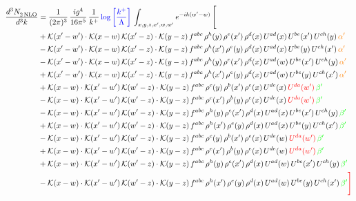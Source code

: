 \documentclass[9pt]{article}
\newcommand{\chg}[1]{{\color{red}#1}}
\numberwithin{equation}{section}
\begin{document}
\begin{align}
  \frac{d^{3}N_{2\,\rm NLO}^{\rm}}{d^{3}k}  & = \frac{1}{(2\pi)^{3}}\, \frac{ig^{4}}{16\pi^{5}}\, \frac{1}{k^{+}}\, {\color{blue}\log{\left[\frac{k^{+}}{\Lambda}\right]}}\, \int_{x,y,z,x^{\prime},w,w^{\prime}}e^{-ik(w^{\prime}-w)}\, \Bigg[\notag \\ &   +\mathcal{K}(x'-w')\cdot\mathcal{K}(x-w)\,\mathcal{K}(x'-z)\cdot\mathcal{K}(y-z)\, f^{abc}\,\rho^{h}(y)\,\rho^{e}(x')\,\rho^{d}(x)\,U^{ad}(x)\,U^{be}(x')\,U^{ch}(y)\,{\color{orange}\alpha'}\notag\\ &-\mathcal{K}(x'-w')\cdot\mathcal{K}(x-w)\,\mathcal{K}(x'-z)\cdot\mathcal{K}(y-z)\, f^{abc}\,\rho^{h}(x')\,\rho^{e}(y)\,\rho^{d}(x)\,U^{ad}(x)\,U^{be}(y)\,U^{ch}(x')\,{\color{orange}\alpha'}\notag\\ &-\mathcal{K}(x'-w')\cdot\mathcal{K}(x-w)\,\mathcal{K}(x'-z)\cdot\mathcal{K}(y-z)\, f^{abc}\,\rho^{h}(y)\,\rho^{e}(x')\,\rho^{d}(x)\,U^{ad}(w)\,U^{be}(x')\,U^{ch}(y)\,{\color{orange}\alpha'}\notag \\ &+\mathcal{K}(x'-w')\cdot\mathcal{K}(x-w)\,\mathcal{K}(x'-z)\cdot\mathcal{K}(y-z)\, f^{abc}\,\rho^{h}(x')\,\rho^{e}(y)\,\rho^{d}(x)\,U^{ad}(w)\,U^{be}(y)\,U^{ch}(x')\,{\color{orange}\alpha'}\notag \\ & +\mathcal{K}(x-w)\cdot\mathcal{K}(x'-w')\,\mathcal{K}(w'-z)\cdot\mathcal{K}(y-z)\, f^{abc}\,\rho^{c}(y)\,\rho^{b}(x')\,\rho^{e}(x)\,U^{de}(x)\,{\color{red}U^{da}(w')}\,{\color{green}\beta'}\notag \\ &-\mathcal{K}(x-w)\cdot\mathcal{K}(x'-w')\,\mathcal{K}(w'-z)\cdot\mathcal{K}(y-z)\, f^{abc}\,\rho^{c}(x')\,\rho^{b}(y)\,\rho^{e}(x)\,U^{de}(x)\,{\color{red}U^{da}(w')}\,{\color{green}\beta'}\notag \\ & -\mathcal{K}(x-w)\cdot\mathcal{K}(x'-w')\,\mathcal{K}(w'-z)\cdot\mathcal{K}(y-z)\, f^{abc}\,\rho^{h}(y)\,\rho^{e}(x')\,\rho^{d}(x)\,U^{ad}(x)\,U^{be}(x')\,U^{ch}(y)\,{\color{green}\beta'}\notag\\ &+\mathcal{K}(x-w)\cdot\mathcal{K}(x'-w')\,\mathcal{K}(w'-z)\cdot\mathcal{K}(y-z)\, f^{abc}\,\rho^{h}(x')\,\rho^{e}(y)\,\rho^{d}(x)\,U^{ad}(x)\,U^{be}(y)\,U^{ch}(x')\,{\color{green}\beta'}\notag\\ &-\mathcal{K}(x-w)\cdot\mathcal{K}(x'-w')\,\mathcal{K}(w'-z)\cdot\mathcal{K}(y-z)\, f^{abc}\,\rho^{c}(y)\,\rho^{b}(x')\,\rho^{e}(x)\,U^{de}(w)\,{\color{red}U^{da}(w')}\,{\color{green}\beta'}\notag\\ &+\mathcal{K}(x-w)\cdot\mathcal{K}(x'-w')\,\mathcal{K}(w'-z)\cdot\mathcal{K}(y-z)\, f^{abc}\,\rho^{c}(x')\,\rho^{b}(y)\,\rho^{e}(x)\,U^{de}(w)\,{\color{red}U^{da}(w')}\,{\color{green}\beta'}\notag\\ &+\mathcal{K}(x-w)\cdot\mathcal{K}(x'-w')\,\mathcal{K}(w'-z)\cdot\mathcal{K}(y-z)\, f^{abc}\,\rho^{h}(y)\,\rho^{e}(x')\,\rho^{d}(x)\,U^{ad}(w)\,U^{be}(x')\,U^{ch}(y)\,{\color{green}\beta'}\notag \\ &-\mathcal{K}(x-w)\cdot\mathcal{K}(x'-w')\,\mathcal{K}(w'-z)\cdot\mathcal{K}(y-z)\, f^{abc}\,\rho^{h}(x')\,\rho^{e}(y)\,\rho^{d}(x)\,U^{ad}(w)\,U^{be}(y)\,U^{ch}(x')\,{\color{green}\beta'}\chg{\Bigg]}
\end{align}  
\end{document}
